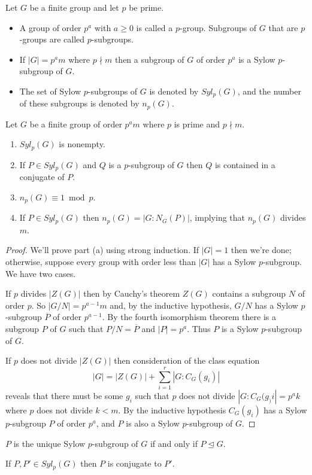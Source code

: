 \documentclass[../m171main.tex]{subfiles}
\begin{document}
\begin{definition}[$p$-group]
    Let $G$ be a finite group and let $p$ be prime.
    \begin{itemize}[topsep=0pt]
        \item A group of order $p^{a}$ with $a \geq 0$ is called a $p$-group.
        Subgroups of $G$ that are $p$-groups are called $p$-subgroups.

        \item If $|G| = p^{a} m$ where $p \nmid m$ then a subgroup of $G$ of order $p^{a}$ is a Sylow $p$-subgroup of $G$.
        
        \item The set of Sylow $p$-subgroups of $G$ is denoted by $Syl_p(G)$, and the number of these subgroups is denoted by $n_p(G)$.
    \end{itemize}
\end{definition}

\begin{theorem}
    Let $G$ be a finite group of order $p^{a}m$ where $p$ is prime and $p \nmid m$.
    \begin{enumerate}[label=(\alph*),topsep=0pt]
        \item $Syl_p(G)$ is nonempty.
        \item If $P \in Syl_p(G)$ and $Q$ is a $p$-subgroup of $G$ then $Q$ is contained in a conjugate of $P$.
        \item $n_p(G) \equiv 1 \bmod p$.
        \item If $P \in Syl_p(G)$ then $n_p(G) = |G : N_G(P)|$, implying that $n_p(G)$ divides $m$.
    \end{enumerate}
\end{theorem}

\begin{proof}
    We'll prove part (a) using strong induction.
    If $|G| = 1$ then we're done; otherwise, suppose every group with order less than $|G|$ has a Sylow $p$-subgroup.
    We have two cases.

    If $p$ divides $|Z(G)|$ then by Cauchy's theorem $Z(G)$ contains a subgroup $N$ of order $p$.
    So $|G / N| = p^{a-1} m$ and, by the inductive hypothesis, $G / N$ has a Sylow $p$-subgroup $\overline P$ of order $p^{a-1}$.
    By the fourth isomorphism theorem there is a subgroup $P$ of $G$ such that $P / N = \overline P$ and $|P| = p^{a}$.
    Thus $P$ is a Sylow $p$-subgroup of $G$.

    If $p$ does not divide $|Z(G)|$ then consideration of the class equation
    \[ |G| = |Z(G)| + \sum_{i=1}^{r} |G : C_G(g_i)| \]
    reveals that there must be some $g_i$ such that $p$ does not divide $|G : C_G(g_)i| = p^{a} k$ where $p$ does not divide $k < m$.
    By the inductive hypothesis $C_G(g_i)$ has a Sylow $p$-subgroup $P$ of order $p^{a}$, and $P$ is also a Sylow $p$-subgroup of $G$.
\end{proof}

\begin{corollary}[]
    $P$ is the unique Sylow $p$-subgroup of $G$ if and only if $P \trianglelefteq G$.
\end{corollary}

\begin{corollary}[]
    If $P,P' \in Syl_p(G)$ then $P$ is conjugate to $P'$.
\end{corollary}
\end{document}
